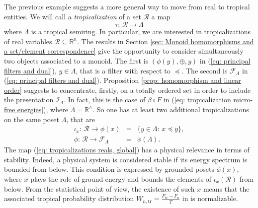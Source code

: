 \documentclass[11pt,british,reqno]{article}
\numberwithin{equation}{section}
\numberwithin{figure}{section}
\numberwithin{table}{section}
\theoremstyle{definition}
\theoremstyle{definition}
\theoremstyle{plain}
\theoremstyle{plain}
\theoremstyle{remark}
\theoremstyle{plain}
\numberwithin{equation}{section}
\numberwithin{figure}{section}
\numberwithin{table}{section}
\theoremstyle{plain}
\begin{document}
The previous example suggests a more general way to
move from real to tropical entities. We will call a \textit{tropicalization}
of a set $\mathcal{R}$ a map 
\begin{equation}
\tau:\,\mathcal{R}\longrightarrow\Lambda\label{eq: tropicalization reals}
\end{equation}
where $\Lambda$ is a tropical semiring. In particular, we are interested in tropicalizations of real variables $\mathcal{R}\subseteq\mathbb{R}^{n}$.
The results in Section \ref{sec: Monoid homomorphisms and a set/element correspondence} give the opportunity to consider simultaneously two objects associated to a monoid. The first is $(\phi(y),\oplus,y)$ in (\ref{eq: principal filters and dual}), $y\in\Lambda$, that is a filter with respect to $\preceq$. The second is $\mathcal{F}_{\Lambda}$ in (\ref{eq: principal filters and dual}).
Proposition \ref{prop: homomorphism and linear order} suggests to
concentrate, firstly, on a totally ordered set in order to include
the presentation $\mathcal{I}_{\Lambda}$. In fact, this is the case
of $\beta\circ F$ in (\ref{eq: tropicalization micro-free energies}),
where $\Lambda=\mathbb{R}^{\wedge}$. So one has at least two additional
tropicalizations on the same poset $\Lambda$, that are 
\begin{eqnarray} 
\iota_{x}:\,\mathcal{R}\longrightarrow\phi(x) & = & \{y\in\Lambda:\,x\preceq y\}, 
\label{eq: tropicalizations reals, global} \\  
\phi:\,\mathcal{R}\longrightarrow\mathcal{F}_{\Lambda} & = & \phi(\Lambda). 
\label{eq: tropicalizations reals, local}
\end{eqnarray}
\label{eq: tropicalizations reals}
The map (\ref{eq: tropicalizations reals, global}) has a physical
relevance in terms of stability. Indeed, a physical system is considered stable if its energy spectrum is bounded from below. This condition is expressed by grounded posets $\phi(x)$, where $x$ plays the role of ground energy and bounds the  elements of $\iota_{x}(\mathcal{R})$ from below. From the statistical point of view, the existence of such $x$ means that the associated tropical probability distribution $W_{n,\mathrm{tr}}=\displaystyle \frac{F_{\mathrm{tr}}-F_n}{T}$ in \cite{AK2015} is normalizable. 
\end{document}

